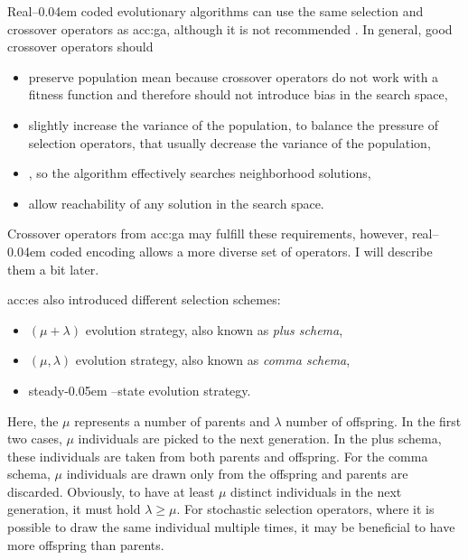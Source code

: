 Real--\kern0.04em coded evolutionary algorithms can use the same selection and crossover operators as \acrshort{acc:ga}, although it is not recommended \citet{IntroductionToEA}. In general, good crossover operators should
\begin{itemize}
    \item preserve population mean because crossover operators do not work with a fitness function and therefore should not introduce bias in the search space,
    \item slightly increase the variance of the population, to balance the pressure of selection operators, that usually decrease the variance of the population,
    \item\label{enum:espopulationvariance} \snipescondition, so the algorithm effectively searches neighborhood solutions,
    \item allow reachability of any solution in the search space.
\end{itemize}
Crossover operators from \acrshort{acc:ga} may fulfill these requirements, however, real--\kern0.04em coded encoding allows a more diverse set of operators. I will describe them a bit later.

\acrshort{acc:es} also introduced different selection schemes:
\begin{itemize}
    \item $\left(\mu+\lambda\right)$ evolution strategy, also known as \emph{plus schema},
    \item  $\left(\mu,\lambda\right)$ evolution strategy, also known as \emph{comma schema},
    \item\label{enum:steadystate} steady\kern-0.05em --state evolution strategy.
\end{itemize}
Here, the $\mu$ represents a number of parents and $\lambda$ number of offspring. In the first two cases, $\mu$ individuals are picked to the next generation. In the plus schema, these individuals are taken from both parents and offspring. For the comma schema, $\mu$ individuals are drawn only from the offspring and parents are discarded. Obviously, to have at least $\mu$ distinct individuals in the next generation, it must hold $\lambda\geq\mu$. For stochastic selection operators, where it is possible to draw the same individual multiple times, it may be beneficial to have more offspring than parents.

